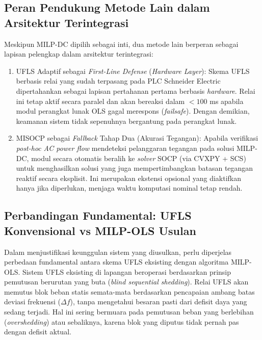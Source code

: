 \subsection{Peran Pendukung Metode Lain dalam Arsitektur Terintegrasi}
\label{subsec:Peran_Pendukung_Metode_Lain}

Meskipun MILP-DC dipilih sebagai inti, dua metode lain berperan sebagai lapisan pelengkap dalam arsitektur terintegrasi:

\begin{enumerate}
    \item[a.] UFLS Adaptif sebagai \textit{First-Line Defense} (\textit{Hardware Layer}): Skema UFLS berbasis relai yang sudah terpasang pada PLC Schneider Electric dipertahankan sebagai lapisan pertahanan pertama berbasis \textit{hardware}. Relai ini tetap aktif secara paralel dan akan bereaksi dalam $< 100$ ms apabila modul perangkat lunak OLS gagal merespons (\textit{failsafe}). Dengan demikian, keamanan sistem tidak sepenuhnya bergantung pada perangkat lunak.
    \item[b.] MISOCP sebagai \textit{Fallback} Tahap Dua (Akurasi Tegangan): Apabila verifikasi \textit{post-hoc} \textit{AC power flow} mendeteksi pelanggaran tegangan pada solusi MILP-DC, modul secara otomatis beralih ke \textit{solver} SOCP (via CVXPY + SCS) untuk menghasilkan solusi yang juga mempertimbangkan batasan tegangan reaktif secara eksplisit. Ini merupakan ekstensi opsional yang diaktifkan hanya jika diperlukan, menjaga waktu komputasi nominal tetap rendah.
\end{enumerate}

\subsection{Perbandingan Fundamental: UFLS Konvensional vs MILP-OLS Usulan}
\label{subsec:Perbandingan_UFLS}

Dalam menjustifikasi keunggulan sistem yang diusulkan, perlu diperjelas perbedaan fundamental antara skema UFLS eksisting dengan algoritma MILP-OLS. Sistem UFLS eksisting di lapangan beroperasi berdasarkan prinsip pemutusan berurutan yang buta (\textit{blind sequential shedding}). Relai UFLS akan memutus blok beban statis semata-mata berdasarkan pencapaian ambang batas deviasi frekuensi ($\Delta f$), tanpa mengetahui besaran pasti dari defisit daya yang sedang terjadi. Hal ini sering bermuara pada pemutusan beban yang berlebihan (\textit{overshedding}) atau sebaliknya, karena blok yang diputus tidak pernah pas dengan defisit aktual.

